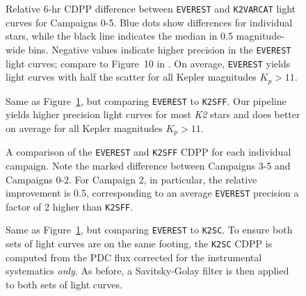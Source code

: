 \documentclass[]{emulateapj}
\begin{document}
\begin{figure}[h]
  \begin{center}
       \caption{Relative 6-hr CDPP difference between \texttt{EVEREST}
                and \texttt{K2VARCAT} light curves for Campaigns 0-5. Blue dots
                show differences for individual stars, while the black line
                indicates the median in 0.5 magnitude-wide bins. Negative
                values indicate higher precision in the \texttt{EVEREST}
                light curves; compare to Figure~10 in \cite{AIG16}. On average, \texttt{EVEREST} yields
                light curves with half the scatter for all Kepler magnitudes $K_p > 11$.}
     \label{fig:comparison_k2varcat}
  \end{center}
\end{figure}
\begin{figure}[h]
  \begin{center}
       \caption{Same as Figure~\ref{fig:comparison_k2varcat}, but comparing 
                \texttt{EVEREST} to \texttt{K2SFF}. Our pipeline yields higher
                precision light curves for most \emph{K2} stars and does
                better on average for all Kepler magnitudes $K_p > 11$.}
     \label{fig:comparison_k2sff}
  \end{center}
\end{figure}
\begin{figure}[h]
  \begin{center}
       \caption{A comparison of the \texttt{EVEREST} and \texttt{K2SFF} CDPP for
                each individual campaign. Note the marked difference between
                Campaigns 3-5 and Campaigns 0-2. For Campaign 2, in particular,
                the relative improvement is 0.5, corresponding to an average
                \texttt{EVEREST} precision a factor of 2 higher than \texttt{K2SFF}.}
     \label{fig:comparison_k2sff_by_campaign}
  \end{center}
\end{figure}
\begin{figure}[h]
  \begin{center}
       \caption{Same as Figure~\ref{fig:comparison_k2varcat}, but comparing 
                \texttt{EVEREST} to \texttt{K2SC}. To ensure both sets of light curves
                are on the same footing, the \texttt{K2SC} CDPP
                is computed from the PDC flux corrected for the instrumental 
                systematics \emph{only}. As before, a Savitsky-Golay filter
                is then applied to both sets of light curves.}
     \label{fig:comparison_k2sc}
  \end{center}
\end{figure}
\end{document}
